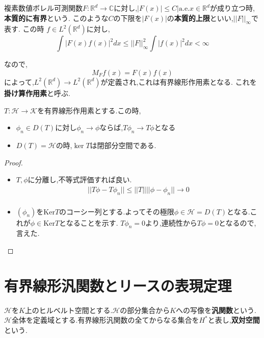\documentclass[uplatex]{jsbook}
\begin{document}
\begin{epl}
複素数値ボレル可測関数$F: \mathbb{R}^d \to \mathbb{C}$に対し,$\lvert F(x) \rvert \le C| \mathrm{a.e.} x \in \mathbb{R}^d$が成り立つ時,\textbf{本質的に有界}という.
このような$C$の下限を$|F(x)|$の\textbf{本質的上限}といい,$||F||_{\infty}$で表す.
この時 $f \in L^2(\mathbb{R}^d)$に対し,
\begin{equation*}
 \int |F(x)f(x)|^2 dx \le ||F||^2_{\infty} \int |f(x)|^2 dx < \infty
\end{equation*}
\end{epl}
なので,
\begin{equation*}
M_Ff(x) = F(x)f(x)
\end{equation*}
によって,$L^2(\mathbb{R}^d) \to L^2(\mathbb{R}^d)$が定義され,これは有界線形作用素となる.
これを\textbf{掛け算作用素}と呼ぶ.

\begin{prop}
$T: \mathcal{H} \to \mathcal{K}$を有界線形作用素とする.この時,
\begin{itemize}
  \item $\phi_n \in D(T)$に対し$\phi_n \to \phi$ならば,$T\phi_n \to T\phi$となる
  \item $D(T) = \mathcal{H}$の時,$\ker T$は閉部分空間である.
\end{itemize}
\end{prop}
\begin{proof}
  \begin{itemize}
    \item  $T, \phi$に分離し,不等式評価すれば良い.
\begin{align*}
    ||T\phi - T\phi_n|| \le ||T|| ||\phi - \phi_n|| \to 0 \\
\end{align*}
    \item
    $(\phi_n)$を$\mathrm{Ker}T$のコーシー列とする.よってその極限$\phi \in \mathcal{H} =D(T)$となる.これが$\phi \in \mathrm{Ker}T$となることを示す.
    $T\phi_n = 0$より,連続性から$T\phi = 0$となるので,言えた.
  \end{itemize}
\end{proof}

\section{有界線形汎関数とリースの表現定理}
$\mathcal{H}$を$K$上のヒルベルト空間とする.$\mathcal{H}$の部分集合から$K$への写像を\textbf{汎関数}という.
$\mathcal{H}$全体を定義域とする.有界線形汎関数の全てからなる集合を$H^*$と表し,\textbf{双対空間}という.
\end{document}
